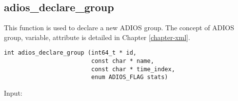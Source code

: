 %
%
%
%
%
%
%

\subsection{adios\_declare\_group}

This function is used to declare a new ADIOS group. The concept of ADIOS group, variable, 
attribute is detailed in Chapter \ref{chapter-xml}.

\begin{lstlisting}[alsolanguage=C,caption={},label={}]
int adios_declare_group (int64_t * id, 
                         const char * name,
                         const char * time_index,
                         enum ADIOS_FLAG stats)
\end{lstlisting}

Input: 

